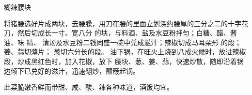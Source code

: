 \begin{recipe}[宫保腰块]{糊辣腰块}

\ingredients


\cooking

\step 将猪腰选好片成两块，去腰臊，用刀在腰的里面立划深约腰厚的三分之二的十字花
刀，然后切成长一寸、宽八分 的块，与料酒、盐及水豆粉拌匀；白糖、醋、酱油、味
精、 清汤及水豆粉二钱同盛一碗中兑成滋汁；辣椒切成马耳朵形 的段；姜、蒜切薄片；
葱切六分长的段。
\step 油下锅，在旺火上烧到八成火候时，放进辣椒段，炒成黑红色时，加入花椒，放下
腰块、葱、姜、蒜，快速炒散，随即沿着锅边倾下已兑好的滋汁，迅速翻炒，颠簸起锅。

\notes

此菜脆嫩香鲜而带甜、咸、酸、辣各种味道，酒饭均宜。

\end{recipe}

